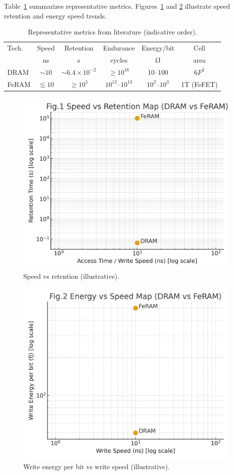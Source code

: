 Table~\ref{tab:comparison} summarizes representative metrics. Figures~\ref{fig:svr} and \ref{fig:evs} illustrate speed retention and energy speed trends.

\begin{table}[!t]
\caption{Representative metrics from literature (indicative order).}
\label{tab:comparison}
\centering
\begin{tabular}{@{}lccccc@{}}
\toprule
Tech. & Speed & Retention & Endurance & Energy/bit & Cell \\
 & ns & s & cycles & fJ & area \\
\midrule
DRAM  & \(\sim 10\) & \(\sim 6.4\times 10^{-2}\) & \(\ge 10^{16}\) & 10--100 & \(6F^{2}\) \\
FeRAM & \(\lesssim 10\) & \(\ge 10^{5}\) & \(10^{12}\)–\(10^{13}\) & \(10^{2}\)–\(10^{3}\) & 1T (FeFET) \\
\bottomrule
\end{tabular}
\end{table}

\begin{figure}[!t]
\centering
\includegraphics[width=\linewidth]{fig1_speed_vs_retention.png}
\caption{Speed vs retention (illustrative).}
\label{fig:svr}
\end{figure}

\begin{figure}[!t]
\centering
\includegraphics[width=\linewidth]{fig2_energy_vs_speed.png}
\caption{Write energy per bit vs write speed (illustrative).}
\label{fig:evs}
\end{figure}
